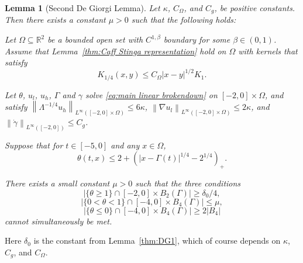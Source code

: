 \documentclass[11pt]{amsart}
\newtheorem{lemma}[theorem]{Lemma}
\theoremstyle{remark}
\theoremstyle{definition}
\newcommand{\R}{\mathbb{R}}
\newcommand{\norm}[1]{\left\lVert#1\right\rVert}
\newcommand{\paren}[1]{\left( #1 \right)}
\newcommand{\abs}[1]{\left\lvert #1 \right\rvert}
\newcommand{\grad}{\nabla}
\newcommand{\ulow}{u_l}
\newcommand{\uhigh}{u_h}
\newcommand{\Cgamma}{C_g}
\newcommand{\Comega}{C_\Omega}
\begin{document}
\begin{lemma}[Second De Giorgi Lemma] \label{thm:DG2}
Let $\kappa$, $\Comega$, and $\Cgamma$, be positive constants. Then there exists a constant $\mu>0$ such that the following holds:

Let $\Omega \subseteq \R^2$ be a bounded open set with $C^{1,\beta}$ boundary for some $\beta \in (0,1)$.  Assume that Lemma~\ref{thm:Caff Stinga representation} hold on $\Omega$ with kernels that satisfy
\[ K_{1/4}(x,y) \leq \Comega |x-y|^{1/2} K_{1}. \]

Let $\theta$, $\ulow$, $\uhigh$, $\Gamma$ and $\gamma$ solve \eqref{eq:main linear brokendown} on $[-2,0]\times\Omega$, and satisfy $\norm{\Lambda^{-1/4} \uhigh}_{L^\infty([-2,0]\times\Omega)} \leq 6 \kappa$, $\norm{\grad \ulow}_{L^\infty([-2,0]\times\Omega)} \leq 2\kappa$, and $\norm{\dot{\gamma}}_{L^\infty([-2,0])} \leq \Cgamma$.  

Suppose that for $t \in [-5,0]$ and any $x \in \Omega$,
\[ \theta(t,x) \leq 2 + \paren{|x-\Gamma(t)|^{1/4}-2^{1/4}}_+. \]

There exists a small constant $\mu > 0$ such that the three conditions
\[ \abs{\{\theta \geq 1\} \cap [-2,0]\times B_2(\Gamma)} \geq \delta_0/4, \]
\[ \abs{\{0 < \theta < 1\} \cap [-4,0]\times B_4(\Gamma)} \leq \mu, \]
\[ \abs{\{\theta \leq 0\} \cap [-4,0]\times B_4(\Gamma)} \geq 2 |B_4| \]
cannot simultaneously be met.  
\end{lemma}

Here $\delta_0$ is the constant from Lemma~\ref{thm:DG1}, which of course depends on $\kappa$, $\Cgamma$, and $\Comega$.  
\end{document}
